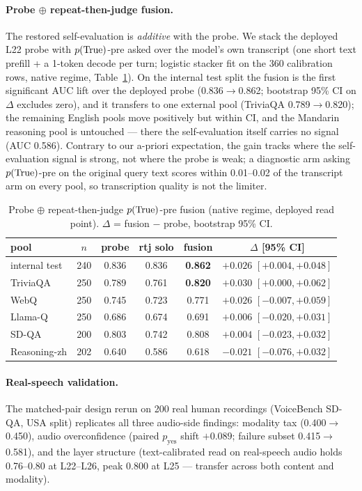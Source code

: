 \paragraph{Probe $\oplus$ repeat-then-judge fusion.} The restored
self-evaluation is \emph{additive} with the probe. We stack the
deployed L22 probe with $p(\mathrm{True})$-pre asked over the model's own
transcript (one short text prefill + a 1-token decode per turn;
logistic stacker fit on the 360 calibration rows, native regime,
Table~\ref{tab:rtjfusion}). On the internal test split the fusion is
the first significant AUC lift over the deployed probe
(0.836$\to$0.862; bootstrap 95\% CI on $\Delta$ excludes zero), and it
transfers to one external pool (TriviaQA 0.789$\to$0.820); the
remaining English pools move positively but within CI, and the
Mandarin reasoning pool is untouched --- there the self-evaluation
itself carries no signal (AUC 0.586). Contrary to our a-priori
expectation, the gain tracks where the self-evaluation signal is
strong, not where the probe is weak; a diagnostic arm asking
$p(\mathrm{True})$-pre on the original query text scores within 0.01--0.02 of
the transcript arm on every pool, so transcription quality is not the
limiter.

\begin{table}[h]
\centering\small
\caption{Probe $\oplus$ repeat-then-judge $p(\mathrm{True})$-pre fusion (native
regime, deployed read point). $\Delta$ = fusion $-$ probe, bootstrap
95\% CI.}
\label{tab:rtjfusion}
\begin{tabular}{lccccc}
\toprule
pool & $n$ & probe & rtj solo & fusion & $\Delta$ [95\% CI] \\
\midrule
internal test & 240 & 0.836 & 0.836 & \textbf{0.862} & $+0.026$ $[+0.004,+0.048]$ \\
TriviaQA & 250 & 0.789 & 0.761 & \textbf{0.820} & $+0.030$ $[+0.000,+0.062]$ \\
WebQ & 250 & 0.745 & 0.723 & 0.771 & $+0.026$ $[-0.007,+0.059]$ \\
Llama-Q & 250 & 0.686 & 0.674 & 0.691 & $+0.006$ $[-0.020,+0.031]$ \\
SD-QA & 200 & 0.803 & 0.742 & 0.808 & $+0.004$ $[-0.023,+0.032]$ \\
Reasoning-zh & 202 & 0.640 & 0.586 & 0.618 & $-0.021$ $[-0.076,+0.032]$ \\
\bottomrule
\end{tabular}
\end{table}

\paragraph{Real-speech validation.} The matched-pair design rerun on
200 real human recordings (VoiceBench SD-QA, USA split) replicates all
three audio-side findings: modality tax (0.400$\to$0.450),
audio overconfidence (paired $p_{\mathrm{yes}}$ shift $+0.089$; failure
subset 0.415$\to$0.581), and the layer structure (text-calibrated read on
real-speech audio holds 0.76--0.80 at L22--L26, peak 0.800 at L25 ---
transfer across both content and modality).


